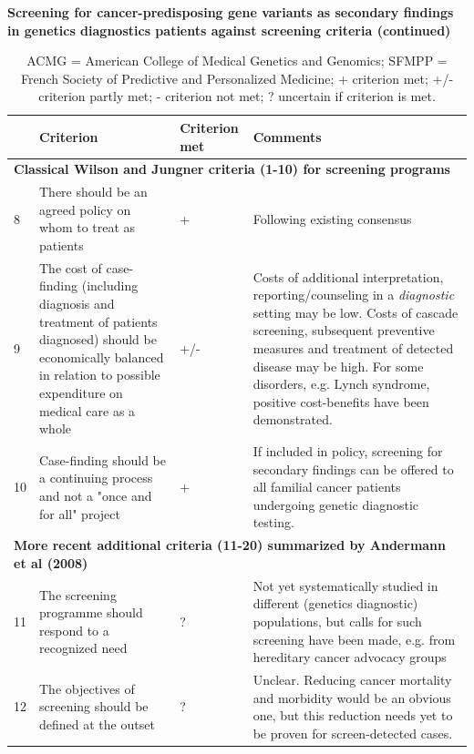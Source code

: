 \begin{table}
	\footnotesize
	\caption*{\label{table:summary2}\textbf{Screening for cancer-predisposing gene variants as secondary findings in genetics diagnostics patients against screening criteria (continued)}}
	\begin{tabular}{ p{0.5cm} p{5.5cm} p{2cm} p{7cm} }
		& \footnotesize{\textbf{Criterion}} & \footnotesize{\textbf{Criterion met}} & \footnotesize{\textbf{Comments}} \\
		\hline 
		\multicolumn{4}{l}{\textbf{Classical Wilson and Jungner criteria (1-10) for screening programs \cite{Andermann_2008}}} \\
		\hline 

		8 & There should be an agreed policy on whom to treat as patients & + & Following existing consensus \\
		9 & The cost of case-finding (including diagnosis and treatment of patients diagnosed) should be economically balanced in relation to possible expenditure on medical care as a whole & +/- & Costs of additional interpretation, reporting/counseling in a \textsl{diagnostic} setting may be low. Costs of cascade screening, subsequent preventive measures and treatment of detected disease may be high. For some disorders, e.g. Lynch syndrome, positive cost-benefits have been demonstrated. \\
		10 & Case-finding should be a continuing process and not a "once and for all" project & + & If included in policy, screening for secondary findings can be offered to all familial cancer patients undergoing genetic diagnostic testing. \newline \\
		
		\hline 
		\multicolumn{4}{l}{\textbf{More recent additional criteria (11-20) summarized by Andermann et al (2008) \cite{Andermann_2008}}} \\
		\hline 
		11 & The screening programme should respond to a recognized need & ? & Not yet systematically studied in different (genetics diagnostic) populations, but calls for such screening have been made, e.g. from hereditary cancer advocacy groups \\
		12 & The objectives of screening should be defined at the outset & ? & Unclear. Reducing cancer mortality and morbidity would be an obvious one, but this reduction needs yet to be proven for screen-detected cases. \\
		\hline
	\end{tabular}
	\caption*{ACMG = American College of Medical Genetics and Genomics; SFMPP = French Society of Predictive and Personalized Medicine; + criterion met; +/- criterion partly met; - criterion not met; ? uncertain if criterion is met.}
\end{table}


